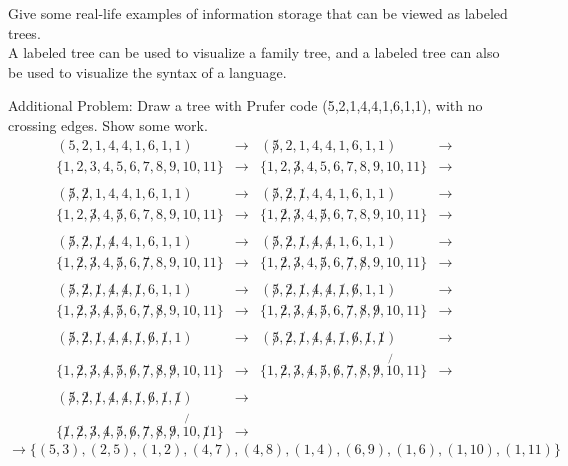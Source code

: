 \documentclass[12pt]{article}
\newcommand{\seti}[1]{\setcounter{enumi}{#1}}
\begin{document}
\seti{11}
\item Give some real-life examples of information storage that can be viewed as labeled trees.\\
A labeled tree can be used to visualize a family tree, and a labeled tree can also be used to visualize the syntax of a language.

\seti{0}
\item Additional Problem: Draw a tree with Prufer code (5,2,1,4,4,1,6,1,1), with no crossing edges. Show some work.
	\begin{align*}
	(5,2,1,4,4,1,6,1,1) &\to& 
	(\not5,2,1,4,4,1,6,1,1) &\to& 
	\\
	\{1,2,3,4,5,6,7,8,9,10,11\} &\to& 
	\{1,2,\not3,4,5,6,7,8,9,10,11\} &\to& 
	\\
	\\
	(\not5,\not2,1,4,4,1,6,1,1) &\to&
	(\not5,\not2,\not1,4,4,1,6,1,1) &\to& 
	\\
	\{1,2,\not3,4,\not5,6,7,8,9,10,11\} &\to&
	\{1,\not2,\not3,4,\not5,6,7,8,9,10,11\} &\to& 
	\\
	\\
	(\not5,\not2,\not1,\not4,4,1,6,1,1) &\to& 
	(\not5,\not2,\not1,\not4,\not4,1,6,1,1) &\to&
	\\
	\{1,\not2,\not3,4,\not5,6,\not7,8,9,10,11\} &\to&
	\{1,\not2,\not3,4,\not5,6,\not7,\not8,9,10,11\} &\to&
	\\ 
	\\
	(\not5,\not2,\not1,\not4,\not4,\not1,6,1,1) &\to& 
	(\not5,\not2,\not1,\not4,\not4,\not1,\not6,1,1) &\to& 
	\\
	\{1,\not2,\not3,\not4,\not5,6,\not7,\not8,9,10,11\} &\to& 
	\{1,\not2,\not3,\not4,\not5,6,\not7,\not8,\not9,10,11\} &\to&
	\\
	\\
	(\not5,\not2,\not1,\not4,\not4,\not1,\not6,\not1,1) &\to&
	(\not5,\not2,\not1,\not4,\not4,\not1,\not6,\not1,\not1) &\to&
	\\
	\{1,\not2,\not3,\not4,\not5,\not6,\not7,\not8,\not9,10,11\} &\to&
	\{1,\not2,\not3,\not4,\not5,\not6,\not7,\not8,\not9,\not{10},11\} &\to&
	\\
	\\
	(\not5,\not2,\not1,\not4,\not4,\not1,\not6,\not1,\not1) &\to&
	\\
	\{\not1,\not2,\not3,\not4,\not5,\not6,\not7,\not8,\not9,\not{10},\not11\} &\to&
	\end{align*}
	\[
	\to\{(5,3),(2,5),(1,2),(4,7),(4,8),(1,4),(6,9),(1,6),(1,10),(1,11)\}
	\]
	
\end{document}
